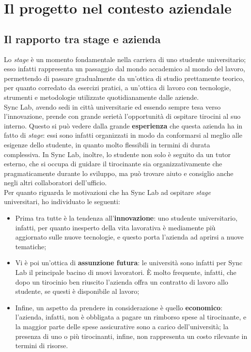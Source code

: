 
\chapter{Il progetto nel contesto aziendale}
\label{cap:progetto-contesto-aziendale}

\section{Il rapporto tra stage e azienda}

Lo \textit{stage} è un momento fondamentale nella carriera di uno studente universitario; esso infatti rappresenta un passaggio dal mondo accademico al mondo del lavoro, permettendo di passare gradualmente da un'ottica di studio prettamente teorico, per quanto corredato da esercizi pratici, a un'ottica di lavoro con tecnologie, strumenti e metodologie utilizzate quotidianamente dalle aziende. \\

Sync Lab, avendo sedi in città universitarie ed essendo sempre tesa verso l'innovazione, prende con grande serietà l'opportunità di ospitare tirocini al suo interno. Questo si può vedere dalla grande \textbf{esperienza} che questa azienda ha in fatto di \textit{stage}: essi sono infatti organizzati in modo da conformarsi al meglio alle esigenze dello studente, in quanto molto flessibili in termini di durata complessiva. In Sync Lab, inoltre, lo studente non solo è seguito da un tutor esterno, che si occupa di guidare il tirocinante sia organizzativamente che pragmaticamente durante lo sviluppo, ma può trovare aiuto e consiglio anche negli altri collaboratori dell'ufficio. \\
Per quanto riguarda le motivazioni che ha Sync Lab ad ospitare \textit{stage} universitari, ho individuato le seguenti:
\begin{itemize}
  \item Prima tra tutte è la tendenza all'\textbf{innovazione}: uno studente universitario, infatti, per quanto inesperto della vita lavorativa è mediamente più aggiornato sulle nuove tecnologie, e questo porta l'azienda ad aprirsi a nuove tematiche;
  \item Vi è poi un'ottica di \textbf{assunzione futura}: le università sono infatti per Sync Lab il principale bacino di nuovi lavoratori. È molto frequente, infatti, che dopo un tirocinio ben riuscito l'azienda offra un contratto di lavoro allo studente, se questi è disponibile al lavoro;
  \item Infine, un aspetto da prendere in considerazione è quello \textbf{economico}: l'azienda, infatti, non è obbligata a pagare un rimborso spese al tirocinante, e la maggior parte delle spese assicurative sono a carico dell'università; la presenza di uno o più tirocinanti, infine, non rappresenta un costo rilevante in termini di risorse.
\end{itemize}

